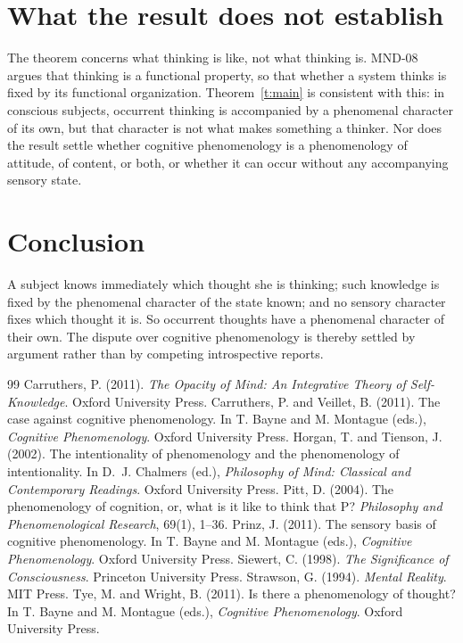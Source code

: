 \documentclass{situationist-preprint}
\begin{document}
\section{What the result does not establish}

The theorem concerns what thinking is like, not what thinking is. MND-08 argues that thinking is a functional property, so that whether a system thinks is fixed by its functional organization. Theorem~\ref{t:main} is consistent with this: in conscious subjects, occurrent thinking is accompanied by a phenomenal character of its own, but that character is not what makes something a thinker. Nor does the result settle whether cognitive phenomenology is a phenomenology of attitude, of content, or both, or whether it can occur without any accompanying sensory state.

\section{Conclusion}

A subject knows immediately which thought she is thinking; such knowledge is fixed by the phenomenal character of the state known; and no sensory character fixes which thought it is. So occurrent thoughts have a phenomenal character of their own. The dispute over cognitive phenomenology is thereby settled by argument rather than by competing introspective reports.

\begin{thebibliography}{99}\small
{} Carruthers, P. (2011). \emph{The Opacity of Mind: An Integrative Theory of Self-Knowledge}. Oxford University Press.
 Carruthers, P. and Veillet, B. (2011). The case against cognitive phenomenology. In T. Bayne and M. Montague (eds.), \emph{Cognitive Phenomenology}. Oxford University Press.
 Horgan, T. and Tienson, J. (2002). The intentionality of phenomenology and the phenomenology of intentionality. In D.~J. Chalmers (ed.), \emph{Philosophy of Mind: Classical and Contemporary Readings}. Oxford University Press.
 Pitt, D. (2004). The phenomenology of cognition, or, what is it like to think that P? \emph{Philosophy and Phenomenological Research}, 69(1), 1--36.
 Prinz, J. (2011). The sensory basis of cognitive phenomenology. In T. Bayne and M. Montague (eds.), \emph{Cognitive Phenomenology}. Oxford University Press.
 Siewert, C. (1998). \emph{The Significance of Consciousness}. Princeton University Press.
 Strawson, G. (1994). \emph{Mental Reality}. MIT Press.
 Tye, M. and Wright, B. (2011). Is there a phenomenology of thought? In T. Bayne and M. Montague (eds.), \emph{Cognitive Phenomenology}. Oxford University Press.
\end{thebibliography}
\end{document}
